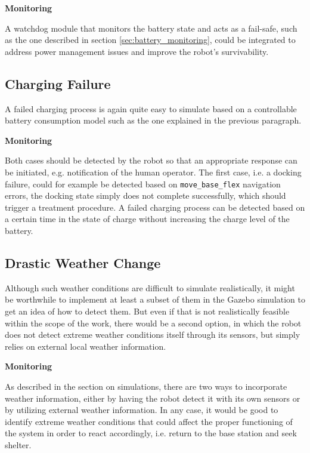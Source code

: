 \documentclass[english, master, utf8]{base/thesis_KBS}
\newcommand{\code}[1]{\colorbox{light-gray}{\texttt{#1}}}
\begin{document}
\noindent
\textbf{Monitoring}\newline

\noindent
A watchdog module that monitors the battery state and acts as a fail-safe, such as the one described in section \ref{sec:battery_monitoring}, could be 
integrated to address power management issues and improve the robot's survivability.

\subsection{Charging Failure}
\label{sec:sim_and_mon_charging_failures}

A failed charging process is again quite easy to simulate based on a controllable battery consumption model such as the one explained in the previous paragraph.\newline

\noindent
\textbf{Monitoring}\newline

\noindent
Both cases should be detected by the robot so that an appropriate response can be initiated, e.g. notification of the human operator. The first case, i.e. a docking 
failure, could for example be detected based on \code{move\_base\_flex} navigation errors, the docking state simply does not complete successfully, which should trigger
a treatment procedure. A failed charging process can be detected based on a certain time in the state of charge without increasing the charge level of the battery.

\subsection{Drastic Weather Change}
\label{sec:sim_and_mon_drastic_weather}

Although such weather conditions are difficult to simulate realistically, it might be worthwhile to implement at least a subset of them in the Gazebo
simulation to get an idea of how to detect them. But even if that is not realistically feasible within the scope of the work, there would be a second
option, in which the robot does not detect extreme weather conditions itself through its sensors, but simply relies on external local weather information.\newline

\noindent
\textbf{Monitoring}\newline

\noindent
As described in the section on simulations, there are two ways to incorporate weather information, either by having the robot detect it with its own sensors or by 
utilizing external weather information. In any case, it would be good to identify extreme weather conditions that could affect the proper functioning of the system 
in order to react accordingly, i.e. return to the base station and seek shelter.
\end{document}
